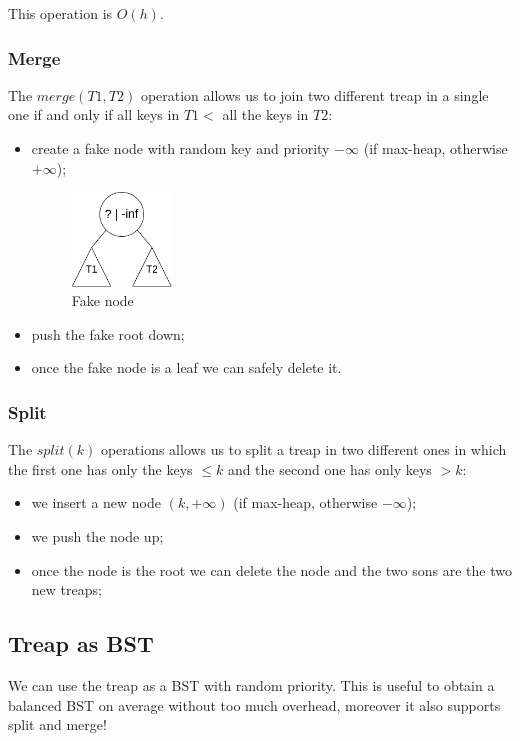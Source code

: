 This operation is $O(h)$.

\subsubsection{Merge}
The $merge(T1, T2)$ operation allows us to join two different treap in a single one if and only if all keys in $T1 < $ all the keys in $T2$:
\begin{itemize}
    \item create a fake node with random key and priority $-\infty$ (if max-heap, otherwise $+\infty$);
    \begin{figure}[H]
        \centering
        \includegraphics[width=100px]{images/4_Randomized_data_structures/merge.png}
        \caption{Fake node}
    \end{figure}
    \item push the fake root down;
    \item once the fake node is a leaf we can safely delete it.
\end{itemize}

\subsubsection{Split}
The $split(k)$ operations allows us to split a treap in two different ones in which the first one has only the keys $\leq k$ and the second one has only keys $> k$:
\begin{itemize}
    \item we insert a new node $(k, +\infty)$ (if max-heap, otherwise $-\infty$);
    \item we push the node up;
    \item once the node is the root we can delete the node and the two sons are the two new treaps;
\end{itemize}

\subsection{Treap as BST}
We can use the treap as a BST with random priority.
This is useful to obtain a balanced BST on average without too much overhead, moreover it also supports split and merge!

